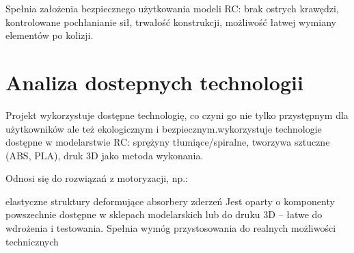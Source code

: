 \documentclass[a4paper,12pt]{article}  %
\begin{document}
Spełnia założenia bezpiecznego użytkowania modeli RC:
brak ostrych krawędzi,
kontrolowane pochłanianie sił,
trwałość konstrukcji,
możliwość łatwej wymiany elementów po kolizji.

\section{Analiza dostepnych technologii}

Projekt wykorzystuje dostępne technologię, co czyni go nie tylko przystępnym dla użytkowników ale też ekologicznym i bezpiecznym.wykorzystuje technologie dostępne w modelarstwie RC:
sprężyny tłumiące/spiralne,
tworzywa sztuczne (ABS, PLA),
druk 3D jako metoda wykonania.

Odnosi się do rozwiązań z motoryzacji, np.:

elastyczne struktury deformujące
absorbery zderzeń 
Jest oparty o komponenty powszechnie dostępne w sklepach modelarskich lub do druku 3D – łatwe do wdrożenia i testowania.
Spełnia wymóg przystosowania do realnych możliwości technicznych

\printbibliography
\end{document}
